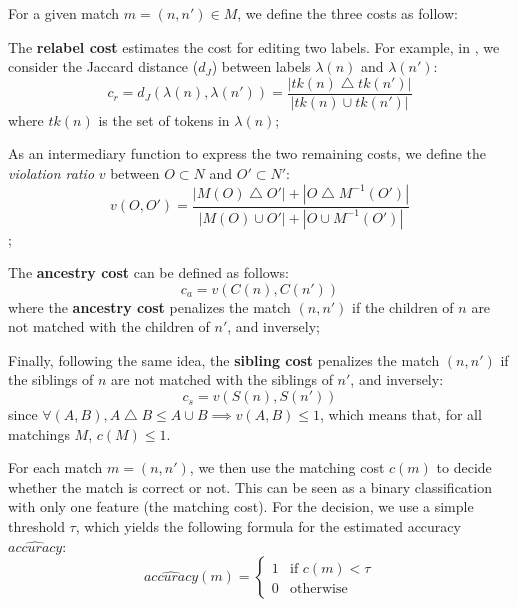 \documentclass{vldb}
\begin{document}
For a given match $m=(n,n') \in M$, we define the three costs as follow:
\begin{compactenum}
    \item The \textbf{relabel cost} estimates the cost for editing two labels.
    For example, in , we consider the Jaccard distance ($d_J$) between labels $\lambda(n)$ and $\lambda(n')$:
    \begin{equation}
        c_r = d_J(\lambda(n), \lambda(n')) = \frac{|tk(n) \bigtriangleup tk(n')|}{|tk(n) \cup tk(n')|}
    \end{equation}
    where $tk(n)$ is the set of tokens in $\lambda(n)$;

    \item As an intermediary function to express the two remaining costs, we define the \textit{violation ratio} $v$ between $O \subset N$ and $O' \subset N'$:
    \begin{equation}
        v(O, O') = \frac{|M(O) \bigtriangleup O'| + |O \bigtriangleup M^{-1}(O')|}{|M(O) \cup O'| + |O \cup M^{-1}(O')|}
    \end{equation};
    
    \item The \textbf{ancestry cost} can be defined as follows:
    \begin{equation}
        c_a = v(C(n), C(n'))
    \end{equation}
    where the \textbf{ancestry cost} penalizes the match $(n,n')$ if the children of $n$ are not matched with the children of $n'$, and inversely;

    \item Finally, following the same idea, the \textbf{sibling cost} penalizes the match $(n, n')$ if the siblings of $n$ are not matched with the siblings of $n'$, and inversely:
    \begin{equation}
        c_s = v(S(n), S(n'))
    \end{equation}
    since $\forall (A, B), A \bigtriangleup B \leq A \cup B \implies v(A, B) \leq 1$, which means that, for all matchings $M$, $c(M) \leq 1$.
\end{compactenum}

For each match $m = (n, n')$, we then use the matching cost $c(m)$ to decide whether the match is correct or not.
This can be seen as a binary classification with only one feature (the matching cost). 
For the decision, we use a simple threshold $\tau$, which yields the following formula for the estimated accuracy $\hat{accuracy}$:
\begin{equation}
\hat{accuracy}(m) = 
\begin{cases}
   1 & \text{if } c(m) < \tau \\
   0 & \text{otherwise}
\end{cases}
\end{equation}
\end{document}
